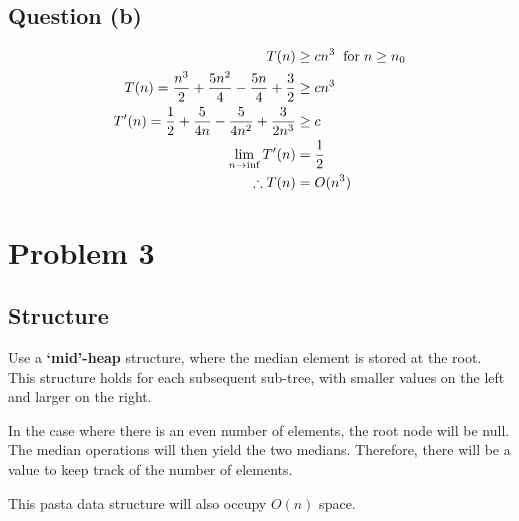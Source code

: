 \documentclass{article}
\begin{document}
\subsection{Question (b)}
\begin{align*}
    T(n) &\geq cn^3 \hspace{2mm} \text{for} \hspace{1mm} n \geq n_0\\
    T(n) = \frac{n^3}{2}
    + \frac{5n^2}{4}
    - \frac{5n}{4}
    + \frac{3}{2}
    &\geq cn^3 \\
    T^{\prime}(n) = \frac{1}{2}
    + \frac{5}{4n}
    - \frac{5}{4n^2}
    + \frac{3}{2n^3}
    &\geq c \\
    \lim_{n \to \inf} T^{\prime}(n) &= \frac{1}{2} \\
    \therefore
    T(n) &= O(n^3)
\end{align*}

\section{Problem 3}
\subsection*{Structure}

Use a \textbf{`mid'-heap} structure, where the median element is stored at the root.
This structure holds for each subsequent sub-tree, with smaller values on the left and larger on the right.

In the case where there is an even number of elements, the root node will be null.
The median operations will then yield the two medians.
Therefore, there will be a value to keep track of the number of elements.

This pasta data structure will also occupy $O(n)$ space.
\end{document}
